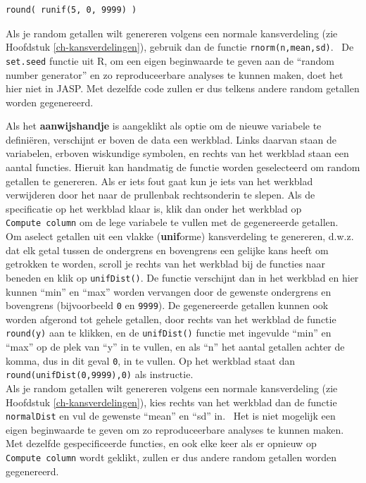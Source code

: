 \documentclass[
]{book}
\begin{document}
\begin{verbatim}
round( runif(5, 0, 9999) )
\end{verbatim}

Als je random getallen wilt genereren volgens een normale kansverdeling (zie Hoofdstuk \ref{ch-kansverdelingen}), gebruik dan de functie \texttt{rnorm(n,mean,sd)}.~
De \texttt{set.seed} functie uit R, om een eigen beginwaarde te geven aan de ``random number generator'' en zo reproduceerbare analyses te kunnen maken, doet het hier niet in JASP. Met dezelfde code zullen er dus telkens andere random getallen worden gegenereerd.

Als het \textbf{aanwijshandje} is aangeklikt als optie om de nieuwe variabele te definiëren, verschijnt er boven de data een werkblad. Links daarvan staan de variabelen, erboven wiskundige symbolen, en rechts van het werkblad staan een aantal functies. Hieruit kan handmatig de functie worden geselecteerd om random getallen te genereren. Als er iets fout gaat kun je iets van het werkblad verwijderen door het naar de prullenbak rechtsonderin te slepen. Als de specificatie op het werkblad klaar is, klik dan onder het werkblad op \texttt{Compute\ column} om de lege variabele te vullen met de gegenereerde getallen.\\
Om aselect getallen uit een vlakke (\textbf{unif}orme) kansverdeling te genereren, d.w.z. dat elk getal tussen de ondergrens en bovengrens een gelijke kans heeft om getrokken te worden, scroll je rechts van het werkblad bij de functies naar beneden en klik op \texttt{unifDist()}. De functie verschijnt dan in het werkblad en hier kunnen ``min'' en ``max'' worden vervangen door de gewenste ondergrens en bovengrens (bijvoorbeeld \texttt{0} en \texttt{9999}). De gegenereerde getallen kunnen ook worden afgerond tot gehele getallen, door rechts van het werkblad de functie \texttt{round(y)} aan te klikken, en de \texttt{unifDist()} functie met ingevulde ``min'' en ``max'' op de plek van ``y'' in te vullen, en als ``n'' het aantal getallen achter de komma, dus in dit geval \texttt{0}, in te vullen. Op het werkblad staat dan \texttt{round(unifDist(0,9999),0)} als instructie.\\
Als je random getallen wilt genereren volgens een normale kansverdeling (zie Hoofdstuk \ref{ch-kansverdelingen}), kies rechts van het werkblad dan de functie \texttt{normalDist} en vul de gewenste ``mean'' en ``sd'' in.~
Het is niet mogelijk een eigen beginwaarde te geven om zo reproduceerbare analyses te kunnen maken. Met dezelfde gespecificeerde functies, en ook elke keer als er opnieuw op \texttt{Compute\ column} wordt geklikt, zullen er dus andere random getallen worden gegenereerd.
\end{document}
